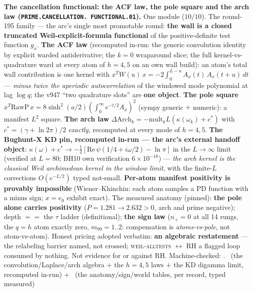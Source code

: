 \documentclass[11pt,a4paper]{article}
\theoremstyle{definition}
\begin{document}
\par\smallskip\noindent\textbf{The cancellation functional: the
ACF law, the pole square and the arch law
(\texttt{PRIME.\allowbreak CANCELLATION.\allowbreak
FUNCTIONAL.01}).}
One module ($10/10$).  The round-195 family --- the arc's single
most promotable round: \textbf{the wall is a closed truncated
Weil-explicit-formula functional} of the positive-definite test
function $g_x$.  \textbf{The ACF law} (recomputed in-run: the
generic convolution identity by explicit warded antiderivative;
the $k = 0$ wraparound slice; the full kernel-vs-quadrature ward
at every atom of $h = 4, 5$ on an own wall build): an atom's
total wall contribution is one kernel with $x^T W(u)\,x =
-2\int_0^{L-u} A_x(t)\,A_x(t + u)\,dt$ --- \emph{minus twice the
aperiodic autocorrelation} of the windowed mode polynomial at lag
$\log q$; the v947 ``two quadrature slots'' are \textbf{one
object}.  \textbf{The pole square} $x^T \mathrm{RawP}\,x =
8\sinh^2(a/2)(\int_0^\infty e^{-t/2} A_x)^2$ (sympy generic $+$
numeric): a manifest $L^2$ square.  \textbf{The arch law}
$\Delta\mathrm{Arch}_k = -\mathrm{mult}_k L(\kappa(\omega_k) +
c^*)$ with $c^* = (\gamma + \ln 2\pi)/2$ \emph{exactly},
recomputed at every mode of $h = 4, 5$.  \textbf{The Bughunt-X KD
pin, recomputed in-run --- the arc's external handoff object}:
$\kappa(\omega) + c^* \to -\tfrac12[\mathrm{Re}\,\psi(1/4 +
i\omega/2) - \ln\pi]$ in the $L \to \infty$ limit (verified at
$L = 80$; BH10 own verification $6\times10^{-18}$) --- \emph{the
arch kernel is the classical Weil archimedean kernel in the
window limit}, with the finite-$L$ corrections $O(e^{-L/2})$
typed not-small.  \textbf{Per-atom manifest positivity is
provably impossible} (Wiener--Khinchin: each atom samples a PD
function with a minus sign; $x = e_0$ exhibit exact).  The
measured anatomy (pinned): \textbf{the pole alone carries
positivity} ($P = 1.281 \to 2.632 > 0$, arch and prime negative);
depth $==$ the $\tau$ ladder (definitional); \textbf{the sign
law} ($n_+ = 0$ at all 14 rungs, the $q = h$ atom exactly zero,
$m_{99} = 1..2$: compensation is \emph{atoms-vs-pole}, not
atom-vs-atom).  Honest pricing adopted verbatim: \textbf{an
algebraic restatement} --- the relabeling barrier named, not
crossed; \textsc{weil-alltests} $\leftrightarrow$ RH a flagged
loop consumed by nothing.  Not evidence for or against RH.
Machine-checked: .
\mE\ (the convolution/Laplace/arch algebra $+$ the $h = 4, 5$
laws $+$ the KD digamma limit, recomputed in-run) $+$ \mC\ (the
anatomy/sign/world tables, per record, typed measured)
\par\smallskip
\end{document}
